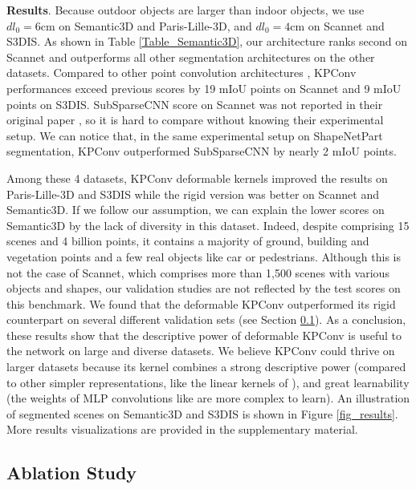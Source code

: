 \documentclass[10pt,twocolumn,letterpaper]{article}
\begin{document}
\noindent
\textbf{Results}. Because outdoor objects are larger than indoor objects, we use ${dl}_0=6 \mathrm{cm}$ on Semantic3D and Paris-Lille-3D, and ${dl}_0=4 \mathrm{cm}$ on Scannet and S3DIS. As shown in Table \ref{Table_Semantic3D}, our architecture ranks second on Scannet and outperforms all other segmentation architectures on the other datasets. Compared to other point convolution architectures \cite{atzmon2018point, li2018pointcnn, wang2018deep}, KPConv performances exceed previous scores by 19 mIoU points on Scannet and 9 mIoU points on S3DIS. SubSparseCNN score on Scannet was not reported in their original paper \cite{graham20183d}, so it is hard to compare without knowing their experimental setup. We can notice that, in the same experimental setup on ShapeNetPart segmentation, KPConv outperformed SubSparseCNN by nearly 2 mIoU points. 

Among these 4 datasets, KPConv deformable kernels improved the results on Paris-Lille-3D and S3DIS while the rigid version was better on Scannet and Semantic3D. If we follow our assumption, we can explain the lower scores on Semantic3D by the lack of diversity in this dataset. Indeed, despite comprising 15 scenes and 4 billion points, it contains a majority of ground, building and vegetation points and a few real objects like car or pedestrians. Although this is not the case of Scannet, which comprises more than 1,500 scenes with various objects and shapes, our validation studies are not reflected by the test scores on this benchmark. We found that the deformable KPConv outperformed its rigid counterpart on several different validation sets (see Section \ref{section_43}). As a conclusion, these results show that the descriptive power of deformable KPConv is useful to the network on large and diverse datasets. We believe KPConv could thrive on larger datasets because its kernel combines a strong descriptive power (compared to other simpler representations, like the linear kernels of \cite{groh2018flex}), and great learnability (the weights of MLP convolutions like \cite{li2018pointcnn, wang2018deep} are more complex to learn). An illustration of segmented scenes on Semantic3D and S3DIS is shown in Figure \ref{fig_results}. More results visualizations are provided in the supplementary material. 

\subsection{Ablation Study}
\label{section_43}
\end{document}
